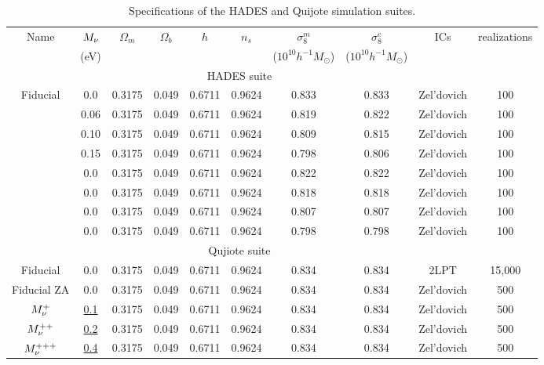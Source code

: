 \begin{table}
\caption{Specifications of the HADES and Quijote simulation suites.} 
\begin{center}
\begin{tabular}{cccccccccc} \toprule
    Name  &$M_\nu$ & $\Omega_m$ & $\Omega_b$ & $h$ & $n_s$ & $\sigma^m_8$ & $\sigma^c_8$ & ICs & realizations \\
      &({\footnotesize eV}) & & & & & ({\footnotesize $10^{10}h^{-1}M_\odot$}) & ({\footnotesize $10^{10}h^{-1}M_\odot$}) & \\[3pt] \hline\hline
    \multicolumn{9}{c}{HADES suite} \\ \hline
    Fiducial    & 0.0   & 0.3175 & 0.049 & 0.6711 & 0.9624 & 0.833 & 0.833 & Zel'dovich & 100 \\ 
                & 0.06  & 0.3175 & 0.049 & 0.6711 & 0.9624 & 0.819 & 0.822 & Zel'dovich & 100 \\ 
                & 0.10  & 0.3175 & 0.049 & 0.6711 & 0.9624 & 0.809 & 0.815 & Zel'dovich & 100 \\ 
                & 0.15  & 0.3175 & 0.049 & 0.6711 & 0.9624 & 0.798 & 0.806 & Zel'dovich & 100 \\ 
                & 0.0   & 0.3175 & 0.049 & 0.6711 & 0.9624 & 0.822 & 0.822 & Zel'dovich & 100 \\ 
                & 0.0   & 0.3175 & 0.049 & 0.6711 & 0.9624 & 0.818 & 0.818 & Zel'dovich & 100 \\ 
                & 0.0   & 0.3175 & 0.049 & 0.6711 & 0.9624 & 0.807 & 0.807 & Zel'dovich & 100 \\ 
                & 0.0   & 0.3175 & 0.049 & 0.6711 & 0.9624 & 0.798 & 0.798 & Zel'dovich & 100 \\[3pt]
    \hline \hline
    \multicolumn{9}{c}{Qujiote suite} \\ \hline
    Fiducial 	    & 0.0         & 0.3175 & 0.049 & 0.6711 & 0.9624 & 0.834 & 0.834 & 2LPT & 15,000 \\ 
    Fiducial ZA     & 0.0         & 0.3175 & 0.049 & 0.6711 & 0.9624 & 0.834 & 0.834 & Zel'dovich& 500 \\ 
    $M_\nu^+$       & \underline{0.1}   & 0.3175 & 0.049 & 0.6711 & 0.9624 & 0.834 & 0.834 & Zel'dovich & 500 \\ 
    $M_\nu^{++}$    & \underline{0.2}   & 0.3175 & 0.049 & 0.6711 & 0.9624 & 0.834 & 0.834 & Zel'dovich & 500 \\ 
    $M_\nu^{+++}$   & \underline{0.4}   & 0.3175 & 0.049 & 0.6711 & 0.9624 & 0.834 & 0.834 & Zel'dovich & 500 \\ 

\end{tabular}
\end{center}
\end{table}

